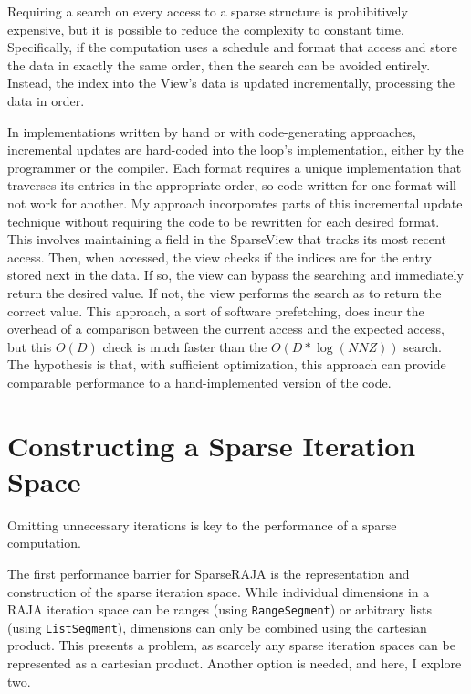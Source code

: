 Requiring a search on every access to a sparse structure is prohibitively expensive, but it is possible to reduce the complexity to constant time.
Specifically, if the computation uses a schedule and format that access and store the data in exactly the same order, then the search can be avoided entirely.
Instead, the index into the View's data is updated incrementally, processing the data in order.

In implementations written by hand or with code-generating approaches, incremental updates are hard-coded into the loop's implementation, either by the programmer or the compiler.
Each format requires a unique implementation that traverses its entries in the appropriate order, so code written for one format will not work for another.
My approach incorporates parts of this incremental update technique without requiring the code to be rewritten for each desired format. 
This involves maintaining a field in the SparseView that tracks its most recent access.
Then, when accessed, the view checks if the indices are for the entry stored next in the data. 
If so, the view can bypass the searching and immediately return the desired value. 
If not, the view performs the search as to return the correct value. 
This approach, a sort of software prefetching, does incur the overhead of a comparison between the current access and the expected access, but this $O(D)$ check is much faster than the $O(D*\log(NNZ))$ search.
The hypothesis is that, with sufficient optimization, this approach can provide comparable performance to a hand-implemented version of the code.

\section{Constructing a Sparse Iteration Space}\label{sec:sparseIterspace}
Omitting unnecessary iterations is key to the performance of a sparse computation. 


The first performance barrier for SparseRAJA is the representation and construction of the sparse iteration space.
While individual dimensions in a RAJA iteration space can be ranges (using \verb.RangeSegment.) or arbitrary lists (using \verb.ListSegment.), dimensions can only be combined using the cartesian product. 
This presents a problem, as scarcely any sparse iteration spaces can be represented as a cartesian product.
Another option is needed, and here, I explore two.

